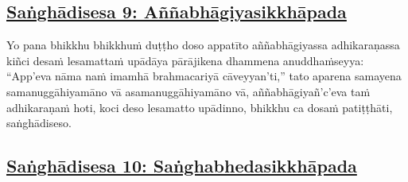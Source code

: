 \subsection*{\hyperref[comm9]{Saṅghādisesa 9: Aññabhāgiyasikkhāpada}}
\label{sd9}

Yo pana bhikkhu bhikkhuṁ duṭṭho doso appatīto aññabhāgiyassa adhikaraṇassa kiñci desaṁ lesamattaṁ upādāya pārājikena dhammena anuddhaṁseyya: ``App'eva nāma naṁ imamhā brahmacariyā cāveyyan'ti,'' tato aparena samayena samanuggāhiyamāno\makeatletter\hyperlink{endnote62-appendix}\makeatother{} vā asamanuggāhiyamāno\makeatletter\hyperlink{endnote63-appendix}\makeatother{} vā, aññabhāgiyañ'c'eva\makeatletter\hyperlink{endnote64-appendix}\makeatother{} taṁ adhikaraṇaṁ hoti, koci deso lesamatto upādinno,\makeatletter\hyperlink{endnote65-appendix}\makeatother{} bhikkhu ca dosaṁ patiṭṭhāti, saṅghādiseso.



\subsection*{\hyperref[comm10]{Saṅghādisesa 10: Saṅghabhedasikkhāpada}}
\label{sd10}

